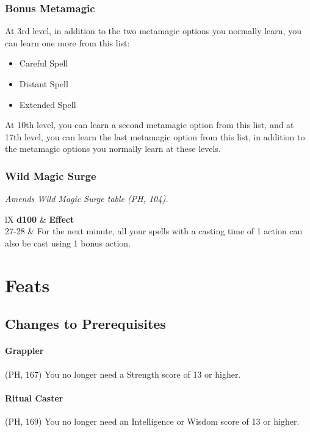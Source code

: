 \documentclass[letterpaper,twocolumn,openany,nodeprecatedcode]{dndbook}
\begin{document}
\subsubsection{Bonus Metamagic}
At 3rd level, in addition to the two metamagic options you normally learn, you can learn one more from this list:

\begin{itemize}
\item Careful Spell
\item Distant Spell 
\item Extended Spell
\end{itemize}

At 10th level, you can learn a second metamagic option from this list, and at 17th level, you can learn the last metamagic option from this list, in addition to the metamagic options you normally learn at these levels.

\subsubsection{Wild Magic Surge}
\textit{Amends Wild Magic Surge table (PH, 104).}

\begin{DndTable}[]{lX}
    \textbf{d100} & \textbf{Effect} \\
    27-28 & For the next minute, all your spells with a casting time of 1 action can also be cast using 1 bonus action.
\end{DndTable}



\label{balance-feats}
\section{Feats}

\subsection{Changes to Prerequisites}

\paragraph{Grappler} (PH, 167) You no longer need a Strength score of 13 or higher.

\paragraph{Ritual Caster} (PH, 169) You no longer need an Intelligence or Wisdom score of 13 or higher.
\end{document}
